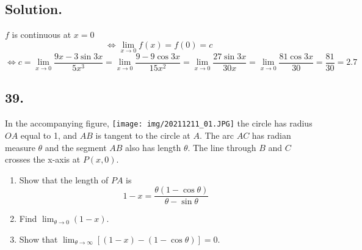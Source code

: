 \documentclass{article}
\begin{document}
\subsection*{Solution.}
$f$ is continuous at $x=0$ 
\[\Leftrightarrow \lim _{x\to 0} f(x)=f(0)=c\]
\[\Leftrightarrow c=\lim _{x\to 0} \frac{9x-3 \sin 3x}{5x^3}=\lim _{x\to 0} \frac{9-9 \cos 3x}{15x^2}=\lim _{x\to 0} \frac{27 \sin 3x}{30x}=\lim _{x\to 0} \frac{81 \cos 3x}{30}=\frac{81}{30}=2.7\]
\subsection*{39.}
In the accompanying figure, \newline 
\texttt{[image: img/20211211\_01.JPG]}\newline 
the circle has radius $OA$ equal to 1, and $AB$ is tangent to the circle at $A$. The arc $AC$ has radian measure $\theta$ and the segment $AB$ also has length $\theta$. The line through $B$ and $C$ crosses the x-axis at $P(x,0)$.
\begin{enumerate}[label=\textbf{\alph*.}]
    \item Show that the length of $PA$ is 
    \[1-x=\frac{\theta(1-\cos\theta)}{\theta-\sin\theta}\]
    \item Find $\lim_{\theta \to 0} (1-x)$.
    \item Show that $\lim _{\theta \to \infty} [(1-x)-(1-\cos\theta)]=0$.
\end{enumerate}
\end{document}
